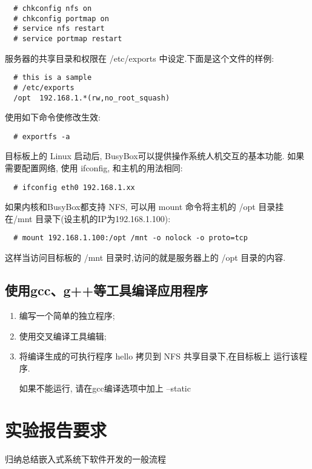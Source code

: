 \begin{boxedminipage}{.9\textwidth}
\begin{verbatim}
  # chkconfig nfs on
  # chkconfig portmap on
  # service nfs restart
  # service portmap restart
\end{verbatim}
\end{boxedminipage}

服务器的共享目录和权限在 /etc/exports 中设定.下面是这个文件的样例:

\begin{boxedminipage}{.9\textwidth}
\begin{verbatim}
  # this is a sample
  # /etc/exports
  /opt  192.168.1.*(rw,no_root_squash)
\end{verbatim}
\end{boxedminipage}

使用如下命令使修改生效:

\begin{boxedminipage}{.9\textwidth}
\begin{verbatim}
  # exportfs -a
\end{verbatim}
\end{boxedminipage}

    目标板上的 Linux 启动后, BusyBox可以提供操作系统人机交互的基本功能.
如果需要配置网络, 使用 ifconfig, 和主机的用法相同:

\begin{boxedminipage}{.9\textwidth}
\begin{verbatim}
  # ifconfig eth0 192.168.1.xx
\end{verbatim}
\end{boxedminipage}

如果内核和BusyBox都支持 NFS, 可以用 mount 命令将主机的 /opt 目录挂在/mnt 
目录下(设主机的IP为192.168.1.100):

\begin{boxedminipage}{.9\textwidth}
\begin{verbatim}
  # mount 192.168.1.100:/opt /mnt -o nolock -o proto=tcp
\end{verbatim}
\end{boxedminipage}

 这样当访问目标板的 /mnt 目录时,访问的就是服务器上的 /opt 目录的内容.

\subsection{使用gcc、g++等工具编译应用程序}
\begin{enumerate}\itemsep=-3pt
  \item 编写一个简单的独立程序;
  \item 使用交叉编译工具编辑;
  \item 将编译生成的可执行程序 hello 拷贝到 NFS 共享目录下,在目标板上
		运行该程序.

		如果不能运行, 请在gcc编译选项中加上 --static
\end{enumerate}

\section{实验报告要求}
    归纳总结嵌入式系统下软件开发的一般流程

